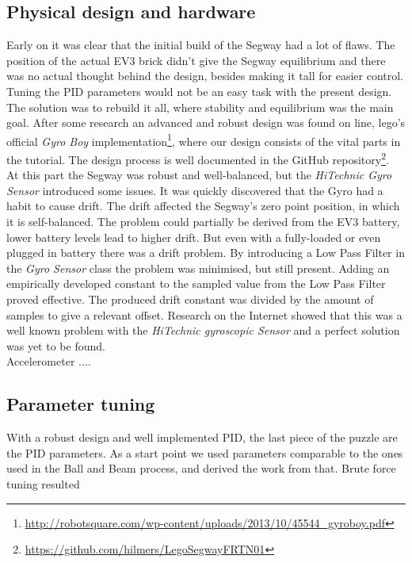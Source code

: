 \subsection{Physical design and hardware}
Early on it was clear that the initial build of the Segway had a lot of flaws. The position of the actual EV3 brick didn't give the Segway equilibrium and there was no actual thought behind the design, besides making it tall for easier control. Tuning the PID parameters would not be an easy task with the present design. The solution was to rebuild it all, where stability and equilibrium was the main goal. After some research an advanced and robust design was found on line, lego's official {\it Gyro Boy}   implementation\footnote{\url{http://robotsquare.com/wp-content/uploads/2013/10/45544_gyroboy.pdf}}, where our design consists of the vital parts in the tutorial. The design process is well documented in the GitHub repository\footnote{\url{https://github.com/hilmers/LegoSegwayFRTN01}}. 
\\[3ex]
At this part the Segway was robust and well-balanced, but the {\it HiTechnic Gyro Sensor} introduced some issues. It was quickly discovered that the Gyro had a habit to cause drift. The drift affected the Segway's zero point position, in which it is self-balanced. The problem could partially be derived from the EV3 battery, lower battery levels lead to higher drift. But even with a fully-loaded or even plugged in battery there was a drift problem. By introducing a Low Pass Filter in the {\it Gyro Sensor} class the problem was minimised, but still present. Adding an empirically developed constant to the sampled value from the Low Pass Filter proved effective. The produced drift constant was divided by the amount of samples to give a relevant offset. Research on the Internet showed that this was a well known problem with the {\it HiTechnic gyroscopic Sensor} and a perfect solution was yet to be found. 
\\[3ex]
Accelerometer ....      

\subsection{Parameter tuning}
With a robust design and well implemented PID, the last piece of the puzzle are the PID parameters. As a start point we used parameters comparable to the ones used in the Ball and Beam process, and derived the work from that. Brute force tuning resulted  


\newpage



